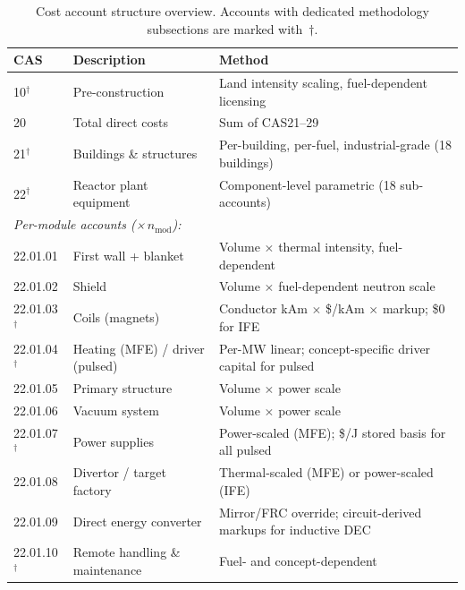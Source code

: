 \documentclass{article}
\begin{document}
\begin{table}[htbp]
\caption{Cost account structure overview. Accounts with dedicated
methodology subsections are marked with~$\dagger$.}
\label{tab:cas-overview}
\centering
\begin{tabular}{llp{7.0cm}}
\toprule
CAS & Description & Method \\
\midrule
10$^\dagger$ & Pre-construction & Land intensity scaling, fuel-dependent licensing \\
20 & Total direct costs & Sum of CAS21--29 \\
21$^\dagger$ & Buildings \& structures & Per-building, per-fuel, industrial-grade (18 buildings) \\
22$^\dagger$ & Reactor plant equipment & Component-level parametric (18 sub-accounts) \\
\multicolumn{3}{l}{\textit{Per-module accounts (×\,$n_{\text{mod}}$):}} \\
\hspace{1em}22.01.01 & First wall + blanket & Volume $\times$ thermal intensity, fuel-dependent \\
\hspace{1em}22.01.02 & Shield & Volume $\times$ fuel-dependent neutron scale \\
\hspace{1em}22.01.03$^\dagger$ & Coils (magnets) & Conductor kAm $\times$ \$/kAm $\times$ markup; \$0 for IFE \\
\hspace{1em}22.01.04$^\dagger$ & Heating (MFE) / driver (pulsed) & Per-MW linear; concept-specific driver capital for pulsed \\
\hspace{1em}22.01.05 & Primary structure & Volume $\times$ power scale \\
\hspace{1em}22.01.06 & Vacuum system & Volume $\times$ power scale \\
\hspace{1em}22.01.07$^\dagger$ & Power supplies & Power-scaled (MFE); \$/J stored basis for all pulsed \\
\hspace{1em}22.01.08 & Divertor / target factory & Thermal-scaled (MFE) or power-scaled (IFE) \\
\hspace{1em}22.01.09 & Direct energy converter & Mirror/FRC override; circuit-derived markups for inductive DEC \\
\hspace{1em}22.01.10$^\dagger$ & Remote handling \& maintenance & Fuel- and concept-dependent \\

\end{tabular}
\end{table}
\end{document}
